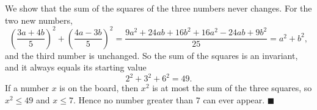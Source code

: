 We show that the sum of the squares of the three numbers never changes. For the two new numbers,
\[
\left(\dfrac{3a+4b}{5}\right)^2+\left(\dfrac{4a-3b}{5}\right)^2=\dfrac{9a^2+24ab+16b^2+16a^2-24ab+9b^2}{25}=a^2+b^2 ,
\]
and the third number is unchanged. So the sum of the squares is an invariant, and it always equals its starting value
\[
2^2+3^2+6^2=49 .
\]
If a number $x$ is on the board, then $x^2$ is at most the sum of the three squares, so $x^2\le49$ and $x\le7$. Hence no number greater than $7$ can ever appear. $\blacksquare$
